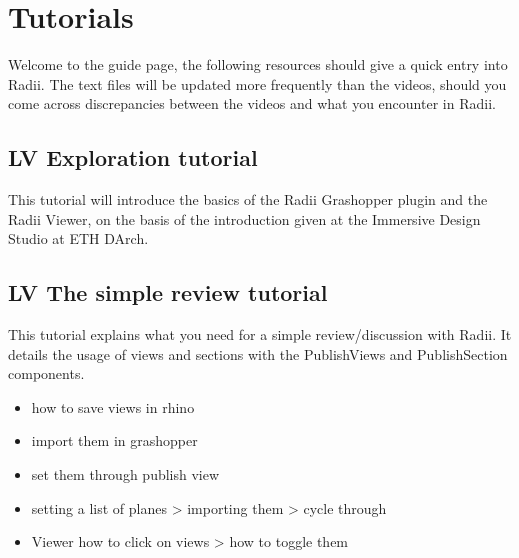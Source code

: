 \documentclass[letterpaper,10pt,english]{sphinxmanual}
\begin{document}
\sphinxstepscope


\section{Tutorials}
\label{\detokenize{tutorial/Quick_Guide/Quick_Guides:tutorials}}\label{\detokenize{tutorial/Quick_Guide/Quick_Guides::doc}}
\sphinxAtStartPar
Welcome to the guide page, the following resources should give a quick entry into Radii.
The text files will be updated more frequently than the videos, should you come across discrepancies between the videos and what you encounter in Radii.

\sphinxAtStartPar
{}

\sphinxstepscope


\subsection{LV Exploration tutorial}
\label{\detokenize{tutorial/Quick_Guide/1_LV_Exploration:lv-exploration-tutorial}}\label{\detokenize{tutorial/Quick_Guide/1_LV_Exploration::doc}}
\sphinxAtStartPar
This tutorial will introduce the basics of the Radii Grashopper plugin and the Radii Viewer, on the basis of the
introduction given at the Immersive Design Studio at ETH D\sphinxhyphen{}Arch.

\sphinxstepscope


\subsection{LV The simple review tutorial}
\label{\detokenize{tutorial/Quick_Guide/2_LV_Simple_Review:lv-the-simple-review-tutorial}}\label{\detokenize{tutorial/Quick_Guide/2_LV_Simple_Review::doc}}
\sphinxAtStartPar
This tutorial explains what you need for a simple review/discussion with Radii.
It details the usage of views and sections with the PublishViews and PublishSection components.
\begin{itemize}
\item {} 
\sphinxAtStartPar
how to save views in rhino

\item {} 
\sphinxAtStartPar
import them in grashopper

\item {} 
\sphinxAtStartPar
set them through publish view

\item {} 
\sphinxAtStartPar
setting a list of planes \textendash{}\textgreater{} importing them \textendash{}\textgreater{} cycle through

\item {} 
\sphinxAtStartPar
Viewer how to click on views \textendash{}\textgreater{} how to toggle them

\end{itemize}
\end{document}
